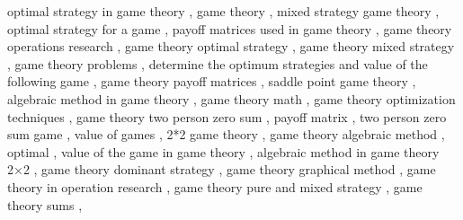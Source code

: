 optimal strategy in game theory	,
game theory	,
mixed strategy game theory	,
optimal strategy for a game	,
payoff matrices used in game theory	,
game theory operations research	,
game theory optimal strategy	,
game theory mixed strategy	,
game theory problems	,
determine the optimum strategies and value of the following game	,
game theory payoff matrices	,
saddle point game theory	,
algebraic method in game theory	,
game theory math	,
game theory optimization techniques	,
game theory two person zero sum	,
payoff matrix	,
two person zero sum game	,
value of games	,
2*2 game theory	,
game theory algebraic method	,
optimal	,
value of the game in game theory	,
algebraic method in game theory 2×2	,
game theory dominant strategy	,
game theory graphical method	,
game theory in operation research	,
game theory pure and mixed strategy	,
game theory sums	,
	